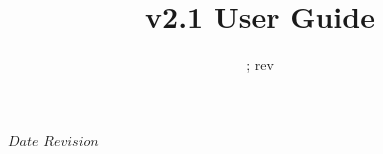 



\newcommand{\Atmosphere}{\texttt{Atmosphere}}
\newcommand{\Cloud}{\texttt{Cloud}}
\newcommand{\Aerosol}{\texttt{Aerosol}}
\newcommand{\Surface}{\texttt{Surface}}
\newcommand{\Geometry}{\texttt{Geometry}}
\newcommand{\GeometryInfo}{\texttt{GeometryInfo}}
\newcommand{\ChannelInfo}{\texttt{ChannelInfo}}
\newcommand{\Options}{\texttt{Options}}
\newcommand{\SSUInput}{\texttt{SSU\_Input}}
\newcommand{\ZeemanInput}{\texttt{Zeeman\_Input}}
\newcommand{\AtmOptics}{\texttt{AtmOptics}}
\newcommand{\SfcOptics}{\texttt{SfcOptics}}
\newcommand{\RTSolution}{\texttt{RTSolution}}
\newcommand{\SensorData}{\texttt{SensorData}}
\newcommand{\AtmAbsorption}{\texttt{AtmAbsorption}}
\newcommand{\AtmScatter}{\texttt{AtmScatter}}
\newcommand{\CloudScatter}{\texttt{CloudScatter}}
\newcommand{\AerosolScatter}{\texttt{AerosolScatter}}
\newcommand{\SpcCoeff}{\texttt{SpcCoeff}}
\newcommand{\f}[1]{\texttt{#1}}
\newcommand{\tblhd}[1]{\sffamily\textbf{#1}}

\newcommand{\inarg}[1]{\f{\textcolor{green}{#1}}}
\newcommand{\outarg}[1]{\f{\textcolor{red}{#1}}}
\newcommand{\optarg}[1]{\f{\textit{#1}}}

\newcommand{\dstar}{\ensuremath{\delta^{*}\!}}
\newcommand{\radunit}{mW/(m\ensuremath{^2}.sr.\invcm)}
\newcommand{\ticket}[1]{\href{https://svnemc.ncep.noaa.gov/trac/crtm/ticket/#1}{{#1}}}

\SVN $Date$
\SVN $Revision$

\title{v2.1 User Guide}
\date{\SVNDate ; rev\SVNRevision}



\maketitle


